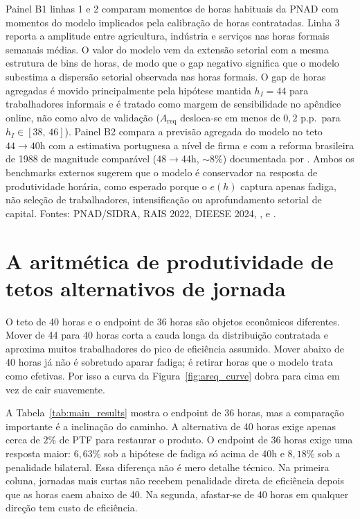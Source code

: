\documentclass[10pt,twocolumn]{article}
\begin{document}
\begin{table}[t]
\begin{minipage}{0.95\textwidth}
{\footnotesize Painel B1 linhas 1 e 2 comparam momentos de horas habituais da PNAD com momentos do modelo implicados pela calibra\c{c}\~ao de horas contratadas. Linha 3 reporta a amplitude entre agricultura, ind\'ustria e servi\c{c}os nas horas formais semanais m\'edias. O valor do modelo vem da extens\~ao setorial com a mesma estrutura de bins de horas, de modo que o gap negativo significa que o modelo subestima a dispers\~ao setorial observada nas horas formais. O gap de horas agregadas \'e movido principalmente pela hip\'otese mantida $h_I=44$ para trabalhadores informais e \'e tratado como margem de sensibilidade no ap\^endice online, n\~ao como alvo de valida\c{c}\~ao ($A_{\text{req}}$ desloca-se em menos de $0{,}2$ p.p.\ para $h_I\in[38,\,46]$). Painel B2 compara a previs\~ao agregada do modelo no teto $44\to 40$h com a estimativa portuguesa a n\'ivel de firma \citep{AsaiLopesTondini2024} e com a reforma brasileira de 1988 de magnitude compar\'avel (48$\to$44h, $\sim$8\%) documentada por \citet{GonzagaMenezesFilhoCamargo2003}. Ambos os benchmarks externos sugerem que o modelo \'e conservador na resposta de produtividade hor\'aria, como esperado porque o $e(h)$ captura apenas fadiga, n\~ao sele\c{c}\~ao de trabalhadores, intensifica\c{c}\~ao ou aprofundamento setorial de capital. Fontes: PNAD/SIDRA, RAIS 2022, DIEESE 2024, \citet{MeghirNaritaRobin2015}, \citet{AsaiLopesTondini2024} e \citet{GonzagaMenezesFilhoCamargo2003} \citep{PNAD2025,RAIS2022,DIEESE2024}.}
\end{minipage}
\end{table}

\section{A aritm\'etica de produtividade de tetos alternativos de jornada}\label{sec:results}

O teto de 40 horas e o endpoint de 36 horas s\~ao objetos econ\^omicos diferentes. Mover de 44 para 40 horas corta a cauda longa da distribui\c{c}\~ao contratada e aproxima muitos trabalhadores do pico de efici\^encia assumido. Mover abaixo de 40 horas j\'a n\~ao \'e sobretudo aparar fadiga; \'e retirar horas que o modelo trata como efetivas. Por isso a curva da Figura~\ref{fig:areq_curve} dobra para cima em vez de cair suavemente.

A Tabela~\ref{tab:main_results} mostra o endpoint de 36 horas, mas a compara\c{c}\~ao importante \'e a inclina\c{c}\~ao do caminho. A alternativa de 40 horas exige apenas cerca de $2\%$ de PTF para restaurar o produto. O endpoint de 36 horas exige uma resposta maior: $6{,}63\%$ sob a hip\'otese de fadiga s\'o acima de 40h e $8{,}18\%$ sob a penalidade bilateral. Essa diferen\c{c}a n\~ao \'e mero detalhe t\'ecnico. Na primeira coluna, jornadas mais curtas n\~ao recebem penalidade direta de efici\^encia depois que as horas caem abaixo de 40. Na segunda, afastar-se de 40 horas em qualquer dire\c{c}\~ao tem custo de efici\^encia.
\end{document}
